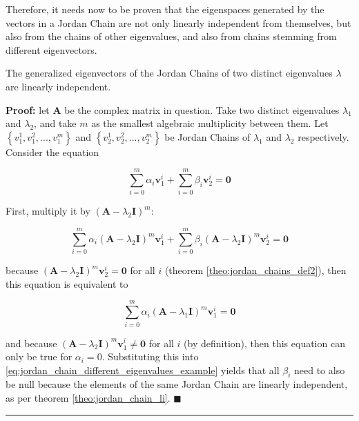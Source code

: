 	Therefore, it needs now to be proven that the eigenspaces generated by the vectors in a Jordan Chain are not only linearly independent from themselves, but also from the chains of other eigenvalues, and also from chains stemming from different eigenvectors.

\begin{theorem} \label{theo:jordan_chain_different_eigenvalues} %
	The generalized eigenvectors of the Jordan Chains of two distinct eigenvalues $\lambda$ are linearly independent.

\end{theorem}
\textbf{Proof:} let $\mathbf{A}$ be the complex matrix in question. Take two distinct eigenvalues $\lambda_1$ and $\lambda_2$, and take $m$ as the smallest algebraic multiplicity between them. Let $\left\{v_1^1,v_1^2,...,v_1^m\right\}$ and $\left\{v_2^1,v_2^2,...,v_2^m\right\}$ be Jordan Chains of $\lambda_1$ and $\lambda_2$ respectively. Consider the equation

\begin{equation} \sum\limits_{i=0}^m \alpha_i \mathbf{v}_1^i + \sum\limits_{i=0}^m \beta_i\mathbf{v}_2^i = \mathbf{0} \label{eq:jordan_chain_different_eigenvalues_example} \end{equation}

	First, multiply it by $\left(\mathbf{A} - \lambda_2\mathbf{I}\right)^m$:

\begin{equation} \sum\limits_{i=0}^m \alpha_i \left(\mathbf{A} - \lambda_2\mathbf{I}\right)^m\mathbf{v}_1^i + \sum\limits_{i=0}^m \beta_i \left(\mathbf{A} - \lambda_2\mathbf{I}\right)^m\mathbf{v}_2^i = \mathbf{0}\end{equation}

	\noindent because $\left(\mathbf{A} - \lambda_2\mathbf{I}\right)^m\mathbf{v}_2^i = \mathbf{0}$ for all $i$ (theorem \ref{theo:jordan_chains_def2}), then this equation is equivalent to 

\begin{equation} \sum\limits_{i=0}^m \alpha_i \left(\mathbf{A} - \lambda_1\mathbf{I}\right)^m\mathbf{v}_1^i = \mathbf{0}\end{equation}

	\noindent and because $\left(\mathbf{A} - \lambda_2\mathbf{I}\right)^m\mathbf{v}_1^i \neq \mathbf{0}$ for all $i$ (by definition), then this equation can only be true for $\alpha_i = 0$. Substituting this into \eqref{eq:jordan_chain_different_eigenvalues_example} yields that all $\beta_i$ need to also be null because the elements of the same Jordan Chain are linearly independent, as per theorem \ref{theo:jordan_chain_li}.
\hfill$\blacksquare$
\vspace{5mm}
\hrule
\vspace{5mm}

